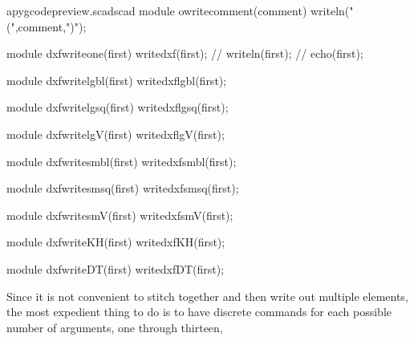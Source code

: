 \documentclass{ltxdoc}
\begin{document}
\lstset{firstnumber=\thepyscad}
\begin{writecode}{a}{pygcodepreview.scad}{scad}
module owritecomment(comment) {
    writeln("(",comment,")");
}

module dxfwriteone(first) {
    writedxf(first);
//    writeln(first);
//    echo(first);
}

module dxfwritelgbl(first) {
    writedxflgbl(first);
}

module dxfwritelgsq(first) {
    writedxflgsq(first);
}

module dxfwritelgV(first) {
    writedxflgV(first);
}

module dxfwritesmbl(first) {
    writedxfsmbl(first);
}

module dxfwritesmsq(first) {
    writedxfsmsq(first);
}

module dxfwritesmV(first) {
    writedxfsmV(first);
}

module dxfwriteKH(first) {
    writedxfKH(first);
}

module dxfwriteDT(first) {
    writedxfDT(first);
}

\end{writecode}
\addtocounter{pyscad}{42}
%

Since it is not convenient to stitch together and then write out multiple elements, the most expedient thing to do is to have discrete commands for each possible number of arguments, one through thirteen, 
 
\end{document}
